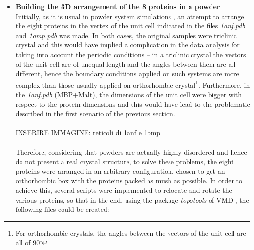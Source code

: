 \begin{itemize}
\item \textbf{Building the 3D arrangement of the 8 proteins in a powder}\\
Initially, as it is usual in powder system simulations \cite{rahaman2017configurational, fichou2015molecular}, an attempt to arrange the eight proteins in the vertex of the unit cell indicated in the files \textit{1anf.pdb} and \textit{1omp.pdb} was made. In both cases, the original samples were triclinic crystal and this would have implied a complication in the data analysis for taking into account the periodic conditions -- in a triclinic crystal the vectors of the unit cell are of unequal length and the angles between them are all different, hence the boundary conditions applied on such systems are more complex than those usually applied on orthorhombic crystal\footnote{For orthorhombic crystals, the angles between the vectors of the unit cell are all of 90$^\circ$}. Furthermore, in the \textit{1anf.pdb} (MBP+Malt), the dimensions of the unit cell were bigger with respect to the protein dimensions and this would have lead to the problematic described in the first scenario of the previous section. \\
\\
INSERIRE IMMAGINE: reticoli di 1anf e 1omp\\
\\
Therefore, considering that powders are actually highly disordered and hence do not present a real crystal structure, to solve these problems, the eight proteins were arranged in an arbitrary configuration, chosen to get an orthorhombic box with the proteins packed as mush as possible. In order to achieve this, several scripts were implemented to relocate and rotate the various proteins, so that in the end, using the package \textit{topotools} of VMD \cite{vmd-topotools}, the following files could be created:

\end{itemize}
